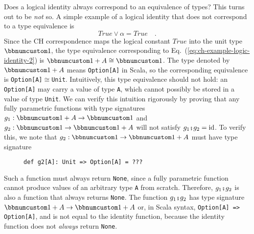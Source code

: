 Does a logical identity always correspond to an equivalence of types?
This turns out to be \emph{not} so. A simple example of a logical
identity that does not correspond to a type equivalence is
\begin{equation}
True\vee\alpha=True\quad.\label{eq:ch-example-logic-identity-2}
\end{equation}
Since the CH correspondence maps the logical constant $True$ into
the unit type $\bbnum 1$, the type equivalence corresponding to Eq.~(\ref{eq:ch-example-logic-identity-2})
is $\bbnum 1+A\cong\bbnum 1$. The type denoted by $\bbnum 1+A$ means
\lstinline!Option[A]! in Scala, so the corresponding equivalence
is \lstinline!Option[A]!$\cong$\lstinline!Unit!. Intuitively, this
type equivalence should not hold: an \lstinline!Option[A]! may carry
a value of type \lstinline!A!, which cannot possibly be stored in
a value of type \lstinline!Unit!. We can verify this intuition rigorously
by proving that any fully parametric functions with type signatures
$g_{1}:\bbnum 1+A\rightarrow\bbnum 1$ and $g_{2}:\bbnum 1\rightarrow\bbnum 1+A$
will not satisfy $g_{1}\bef g_{2}=\text{id}$. To verify this, we
note that $g_{2}:\bbnum 1\rightarrow\bbnum 1+A$ must have type signature

\begin{wrapfigure}{l}{0.4\columnwidth}%
\vspace{-0.8\baselineskip}
\begin{lstlisting}
def g2[A]: Unit => Option[A] = ???
\end{lstlisting}

\vspace{-1\baselineskip}
\end{wrapfigure}%

\noindent Such a function must always return \lstinline!None!, since
a fully parametric function cannot produce values of an arbitrary
type \lstinline!A! from scratch. Therefore, $g_{1}\bef g_{2}$ is
also a function that always returns \lstinline!None!. The function
$g_{1}\bef g_{2}$ has type signature $\bbnum 1+A\rightarrow\bbnum 1+A$
or, in Scala syntax, \lstinline!Option[A] => Option[A]!, and is not
equal to the identity function, because the identity function does
not \emph{always} return \lstinline!None!.

